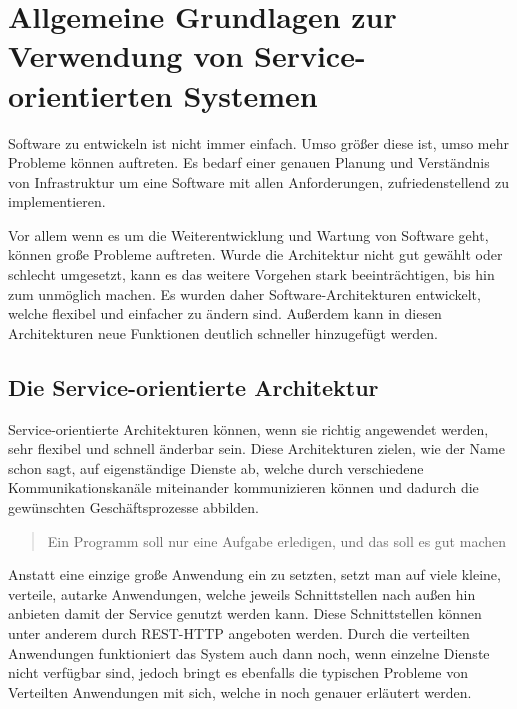 \chapter[Grundlagen]{Allgemeine Grundlagen zur Verwendung von Service-orientierten Systemen}
\label{chap:grundlagen}
Software zu entwickeln ist nicht immer einfach. Umso größer diese ist, umso mehr Probleme können auftreten. Es bedarf einer genauen Planung und Verständnis von Infrastruktur um eine Software mit allen Anforderungen, zufriedenstellend zu implementieren. 

Vor allem wenn es um die Weiterentwicklung und Wartung von Software geht, können große Probleme auftreten. Wurde die Architektur nicht gut gewählt oder schlecht umgesetzt, kann es das weitere Vorgehen stark beeinträchtigen, bis hin zum unmöglich machen. Es wurden daher Software-Architekturen entwickelt, welche flexibel und einfacher zu ändern sind. Außerdem kann in diesen Architekturen neue Funktionen deutlich schneller hinzugefügt werden.

\section{Die Service-orientierte Architektur}
\label{sec:architektur}
Service-orientierte Architekturen können, wenn sie richtig angewendet werden, sehr flexibel und schnell änderbar sein. Diese Architekturen zielen, wie der Name schon sagt, auf eigenständige Dienste ab, welche durch verschiedene Kommunikationskanäle miteinander kommunizieren können und dadurch die gewünschten Geschäftsprozesse abbilden. 
\begin{quotation}
    \frqq Ein Programm soll nur eine Aufgabe erledigen, und das soll es gut machen\flqq \cite[S. 2]{EWolff2015:ContinuouosDelivery}
\end{quotation}
Anstatt eine einzige große Anwendung ein zu setzten, setzt man auf viele kleine, verteile, autarke Anwendungen, welche jeweils Schnittstellen nach außen hin anbieten damit der Service genutzt werden kann. Diese Schnittstellen können unter anderem durch REST-HTTP angeboten werden.
Durch die verteilten Anwendungen funktioniert das System auch dann noch, wenn einzelne Dienste nicht verfügbar sind, jedoch bringt es ebenfalls die typischen Probleme von Verteilten Anwendungen mit sich, welche in  noch genauer erläutert werden.

